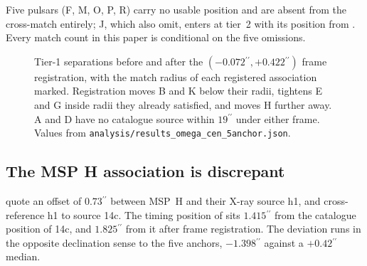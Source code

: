 \documentclass[11pt]{article}
\newcommand{\as}{\ensuremath{^{\prime\prime}}}
\begin{document}
Five pulsars (F, M, O, P, R) carry no usable position and are absent from the cross-match entirely; J, which \citet{ColomiBernadich2026} also omit, enters at tier~2 with its position from \citet{Chen2023}. Every match count in this paper is conditional on the five omissions.

\begin{figure}[tbp]
\centering
{}
\caption{Tier-1 separations before and after the $(-0.072\as, +0.422\as)$ frame registration, with the match radius of each registered association marked. Registration moves B and K below their radii, tightens E and G inside radii they already satisfied, and moves H further away. A and D have no catalogue source within $19\as$ under either frame. Values from \texttt{analysis/results\_omega\_cen\_5anchor.json}.}
\label{fig:separations}
\end{figure}

\subsection{The MSP H association is discrepant}
\label{sec:results-h}

\citet{ZhaoHeinke2023} quote an offset of $0.73\as$ between MSP~H and their X-ray source h1, and cross-reference h1 to \citet{Henleywillis2018} source 14c. The timing position of \citet{ColomiBernadich2026} sits $1.415\as$ from the catalogue position of 14c, and $1.825\as$ from it after frame registration. The deviation runs in the opposite declination sense to the five anchors, $-1.398\as$ against a $+0.42\as$ median.
\end{document}
